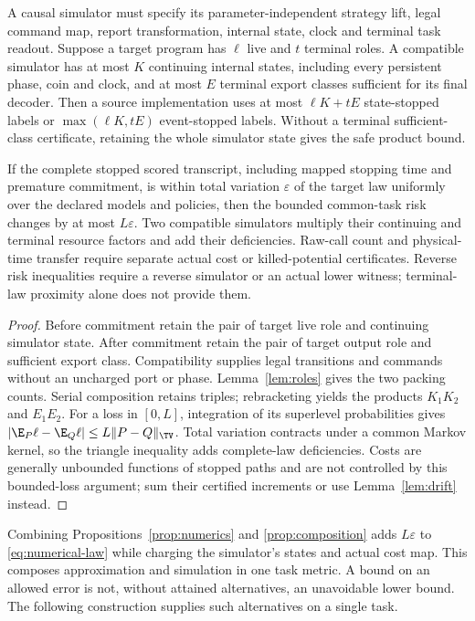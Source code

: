\begin{proposition}\label{prop:composition}
A causal simulator must specify its parameter-independent strategy lift, legal command map, report transformation, internal state, clock and terminal task readout. Suppose a target program has $\ell$ live and $t$ terminal roles. A compatible simulator has at most $K$ continuing internal states, including every persistent phase, coin and clock, and at most $E$ terminal export classes sufficient for its final decoder. Then a source implementation uses at most $\ell K+tE$ state-stopped labels or $\max(\ell K,tE)$ event-stopped labels. Without a terminal sufficient-class certificate, retaining the whole simulator state gives the safe product bound.

If the complete stopped scored transcript, including mapped stopping time and premature commitment, is within total variation $\varepsilon$ of the target law uniformly over the declared models and policies, then the bounded common-task risk changes by at most $L\varepsilon$. Two compatible simulators multiply their continuing and terminal resource factors and add their deficiencies. Raw-call count and physical-time transfer require separate actual cost or killed-potential certificates. Reverse risk inequalities require a reverse simulator or an actual lower witness; terminal-law proximity alone does not provide them.
\end{proposition}
\begin{proof}
Before commitment retain the pair of target live role and continuing simulator state. After commitment retain the pair of target output role and sufficient export class. Compatibility supplies legal transitions and commands without an uncharged port or phase. Lemma~\ref{lem:roles} gives the two packing counts. Serial composition retains triples; rebracketing yields the products $K_1K_2$ and $E_1E_2$. For a loss in $[0,L]$, integration of its superlevel probabilities gives $|\E_P\ell-\E_Q\ell|\le L\|P-Q\|_{\TV}$. Total variation contracts under a common Markov kernel, so the triangle inequality adds complete-law deficiencies. Costs are generally unbounded functions of stopped paths and are not controlled by this bounded-loss argument; sum their certified increments or use Lemma~\ref{lem:drift} instead.
\end{proof}

Combining Propositions~\ref{prop:numerics} and \ref{prop:composition} adds $L\varepsilon$ to \eqref{eq:numerical-law} while charging the simulator's states and actual cost map. This composes approximation and simulation in one task metric. A bound on an allowed error is not, without attained alternatives, an unavoidable lower bound. The following construction supplies such alternatives on a single task.

